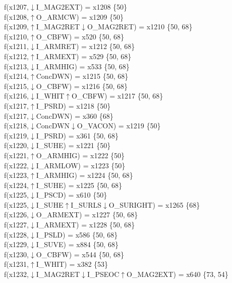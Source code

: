 f(x1207,$\downarrow$I\_MAG2EXT) = x1208 \{50\} \\  
f(x1208,$\uparrow$O\_ARMCW) = x1209 \{50\} \\  
f(x1209,$\uparrow$I\_MAG2RET$\downarrow$O\_MAG2RET) = x1210 \{50, 68\} \\  
f(x1210,$\uparrow$O\_CBFW) = x520 \{50, 68\} \\  
f(x1211,$\downarrow$I\_ARMRET) = x1212 \{50, 68\} \\  
f(x1212,$\uparrow$I\_ARMEXT) = x529 \{50, 68\} \\  
f(x1213,$\downarrow$I\_ARMHIG) = x533 \{50, 68\} \\  
f(x1214,$\uparrow$ConcDWN) = x1215 \{50, 68\} \\  
f(x1215,$\downarrow$O\_CBFW) = x1216 \{50, 68\} \\  
f(x1216,$\downarrow$I\_WHIT$\uparrow$O\_CBFW) = x1217 \{50, 68\} \\  
f(x1217,$\uparrow$I\_PSRD) = x1218 \{50\} \\  
f(x1217,$\downarrow$ConcDWN) = x360 \{68\} \\  
f(x1218,$\downarrow$ConcDWN$\downarrow$O\_VACON) = x1219 \{50\} \\  
f(x1219,$\downarrow$I\_PSRD) = x361 \{50, 68\} \\  
f(x1220,$\downarrow$I\_SUHE) = x1221 \{50\} \\  
f(x1221,$\uparrow$O\_ARMHIG) = x1222 \{50\} \\  
f(x1222,$\downarrow$I\_ARMLOW) = x1223 \{50\} \\  
f(x1223,$\uparrow$I\_ARMHIG) = x1224 \{50, 68\} \\  
f(x1224,$\uparrow$I\_SUHE) = x1225 \{50, 68\} \\  
f(x1225,$\downarrow$I\_PSCD) = x610 \{50\} \\  
f(x1225,$\downarrow$I\_SUHE$\uparrow$I\_SURLS$\downarrow$O\_SURIGHT) = x1265 \{68\} \\  
f(x1226,$\downarrow$O\_ARMEXT) = x1227 \{50, 68\} \\  
f(x1227,$\downarrow$I\_ARMEXT) = x1228 \{50, 68\} \\  
f(x1228,$\downarrow$I\_PSLD) = x586 \{50, 68\} \\  
f(x1229,$\downarrow$I\_SUVE) = x884 \{50, 68\} \\  
f(x1230,$\downarrow$O\_CBFW) = x544 \{50, 68\} \\  
f(x1231,$\uparrow$I\_WHIT) = x382 \{53\} \\  
f(x1232,$\downarrow$I\_MAG2RET$\downarrow$I\_PSEOC$\uparrow$O\_MAG2EXT) = x640 \{73, 54\} \\  
